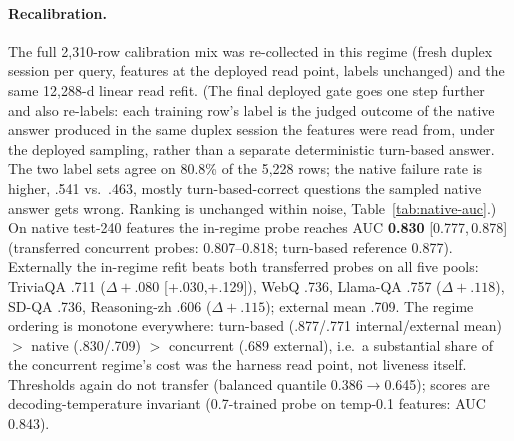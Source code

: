 \paragraph{Recalibration.} The full 2{,}310-row calibration mix was
re-collected in this regime (fresh duplex session per query, features
at the deployed read point, labels unchanged) and the same 12{,}288-d
linear read refit. (The final deployed gate goes one step further and
also re-labels: each training row's label is the judged outcome of
the native answer produced in the same duplex session the features
were read from, under the deployed sampling, rather than a separate
deterministic turn-based answer. The two label sets agree on 80.8\%
of the 5{,}228 rows; the native failure rate is higher, .541
vs.\ .463, mostly turn-based-correct questions the sampled native
answer gets wrong. Ranking is unchanged within noise,
Table~\ref{tab:native-auc}.) On native test-240 features the in-regime probe
reaches AUC \textbf{0.830} [0.777,\,0.878] (transferred concurrent
probes: 0.807--0.818; turn-based reference 0.877). Externally the
in-regime refit beats both transferred probes on all five pools:
TriviaQA .711 ($\Delta{+}.080$ [+.030,+.129]), WebQ .736, Llama-QA
.757 ($\Delta{+}.118$), SD-QA .736, Reasoning-zh .606
($\Delta{+}.115$); external mean .709. The regime ordering is
monotone everywhere: turn-based (.877/.771 internal/external mean)
$>$ native (.830/.709) $>$ concurrent (.689 external), i.e.\ a
substantial share of the concurrent regime's cost was the harness
read point, not liveness itself. Thresholds again do not
transfer (balanced quantile 0.386$\to$0.645); scores are
decoding-temperature invariant (0.7-trained probe on temp-0.1
features: AUC 0.843).

